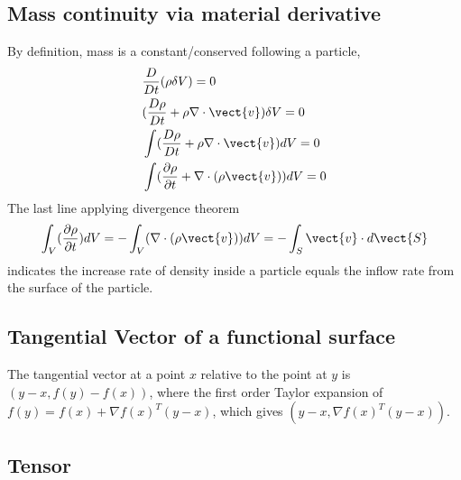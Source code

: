\subsection{Mass continuity via material derivative}
By definition, mass is a constant/conserved following a particle,
\begin{equation}
    \begin{aligned}
        & \frac{D}{Dt} (\rho \delta V) = 0  \\
        & (\frac{D\rho}{Dt} + \rho\nabla \cdot \vect{v})\delta V = 0 \\
        & \int(\frac{D\rho}{Dt} + \rho\nabla\cdot\vect{v})dV = 0 \\
        & \int(\frac{\partial\rho}{\partial t} + \nabla\cdot(\rho\vect{v}))dV = 0 \\
    \end{aligned}
\end{equation}
The last line applying divergence theorem
\begin{equation}
    \int_V(\frac{\partial\rho}{\partial t})dV = -\int_V(\nabla\cdot(\rho\vect{v}))dV = -\int_S \vect{v} \cdot d\vect{S}
\end{equation}
indicates the increase rate of density inside a particle equals the inflow rate from the surface of the particle.

\subsection{Tangential Vector of a functional surface}
The tangential vector at a point $x$ relative to the point at $y$ is $(y-x,f(y)-f(x))$, where the
first order Taylor expansion of $f(y) = f(x) + \nabla f(x)^T(y-x)$, which gives $(y-x,\nabla f(x)^T(y-x))$.  

\subsection{Tensor}
